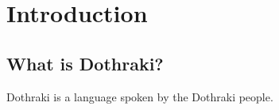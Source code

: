 \chapter*{Introduction}
\section*{What is Dothraki?}
Dothraki is a language spoken by the Dothraki people.
